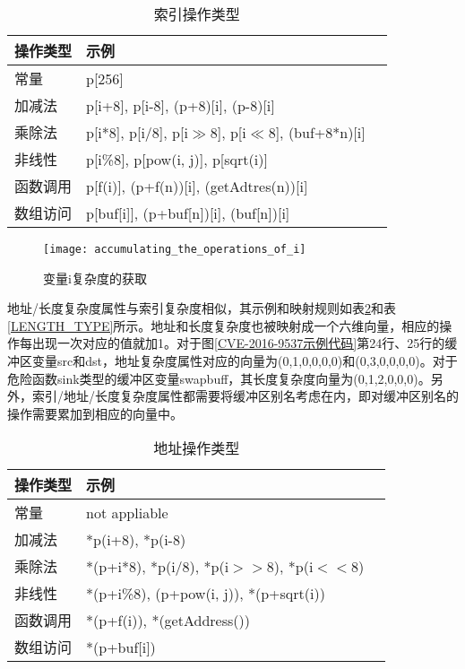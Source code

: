 {\begin{table}[ht]
\begin{center}
\caption{索引操作类型} \label{Index_Type}
\begin{small}
\begin{tabular}{lll}
\hline
{\bf 操作类型 } & {\bf 示例}\\
\hline
常量 & p[256] \\ \hline
加减法 & p[i+8], p[i-8], (p+8)[i], (p-8)[i] \\ \hline
乘除法 & p[i*8], p[i/8], p[i$\gg$8], p[i$\ll$8], (buf+8*n)[i] \\ \hline
非线性 & p[i\%8], p[pow(i, j)], p[sqrt(i)] \\ \hline
函数调用 & p[f(i)], (p+f(n))[i], (getAdtres(n))[i] \\ \hline
数组访问 & p[buf[i]], (p+buf[n])[i], (buf[n])[i] \\ \hline
\end{tabular}
\end{small}
\end{center}
\end{table}

\begin{figure}[htp]
\centering
\texttt{[image: accumulating\_the\_operations\_of\_i]}
\caption{变量i复杂度的获取}
\label{accumulating_the_operations_of_i}
\end{figure}

地址/长度复杂度属性与索引复杂度相似，其示例和映射规则如表\ref{ADDRESS_TYPE}和表\ref{LENGTH_TYPE}所示。地址和长度复杂度也被映射成一个六维向量，相应的操作每出现一次对应的值就加1。对于图\ref{CVE-2016-9537示例代码}第24行、25行的缓冲区变量src和dst，地址复杂度属性对应的向量为{(0,1,0,0,0,0)}和{(0,3,0,0,0,0)}。对于危险函数sink类型的缓冲区变量swapbuff，其长度复杂度向量为{(0,1,2,0,0,0)}。另外，索引/地址/长度复杂度属性都需要将缓冲区别名考虑在内，即对缓冲区别名的操作需要累加到相应的向量中。

\begin{table}[ht]
\begin{center}
\caption{地址操作类型} \label{ADDRESS_TYPE}
\begin{small}
\begin{tabular}{lll}
\hline
{\bf 操作类型 } & {\bf 示例}\\
\hline
常量 & not appliable \\ \hline
加减法 & *p(i+8), *p(i-8) \\ \hline
乘除法 & *(p+i*8), *p(i/8), *p(i$>>$8), *p(i$<<8$) \\ \hline
非线性 & *(p+i\%8), (p+pow(i, j)), *(p+sqrt(i)) \\ \hline
函数调用 & *(p+f(i)), *(getAddress()) \\ \hline
数组访问 & *(p+buf[i]) \\ \hline
\end{tabular}
\end{small}
\end{center}
\end{table}


}
